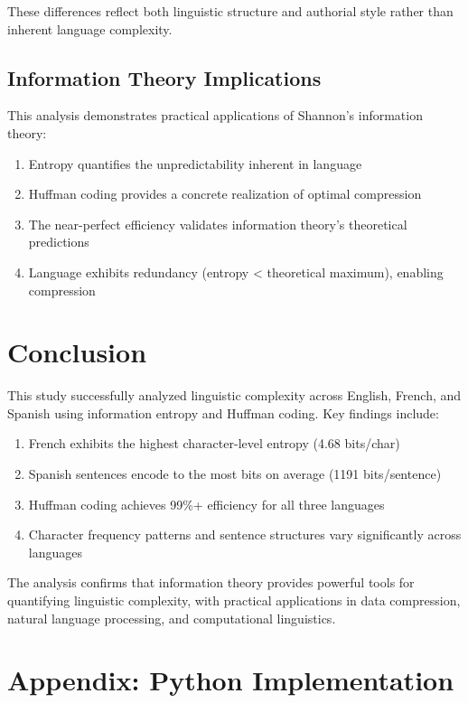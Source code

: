 \documentclass[11pt,a4paper]{article}
\begin{document}
These differences reflect both linguistic structure and authorial style rather than inherent language complexity.

\subsection{Information Theory Implications}

This analysis demonstrates practical applications of Shannon's information theory:

\begin{enumerate}
    \item Entropy quantifies the unpredictability inherent in language
    \item Huffman coding provides a concrete realization of optimal compression
    \item The near-perfect efficiency validates information theory's theoretical predictions
    \item Language exhibits redundancy (entropy < theoretical maximum), enabling compression
\end{enumerate}

\section{Conclusion}

This study successfully analyzed linguistic complexity across English, French, and Spanish using information entropy and Huffman coding. Key findings include:

\begin{enumerate}
    \item French exhibits the highest character-level entropy (4.68 bits/char)
    \item Spanish sentences encode to the most bits on average (1191 bits/sentence)
    \item Huffman coding achieves 99\%+ efficiency for all three languages
    \item Character frequency patterns and sentence structures vary significantly across languages
\end{enumerate}

The analysis confirms that information theory provides powerful tools for quantifying linguistic complexity, with practical applications in data compression, natural language processing, and computational linguistics.

\section{Appendix: Python Implementation}
\end{document}
